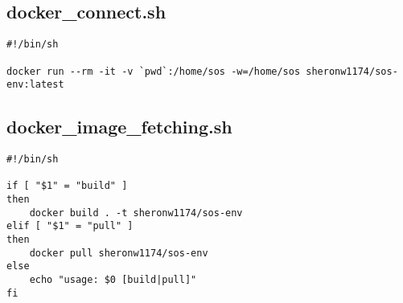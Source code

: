 \documentclass[main.tex]{subfiles}
\begin{document}
\subsection{docker\_connect.sh}
\begin{lstlisting}
#!/bin/sh

docker run --rm -it -v `pwd`:/home/sos -w=/home/sos sheronw1174/sos-env:latest
\end{lstlisting}

\subsection{docker\_image\_fetching.sh}
\begin{lstlisting}
#!/bin/sh

if [ "$1" = "build" ]
then
    docker build . -t sheronw1174/sos-env
elif [ "$1" = "pull" ]
then
    docker pull sheronw1174/sos-env
else
    echo "usage: $0 [build|pull]"
fi
\end{lstlisting}
\end{document}
